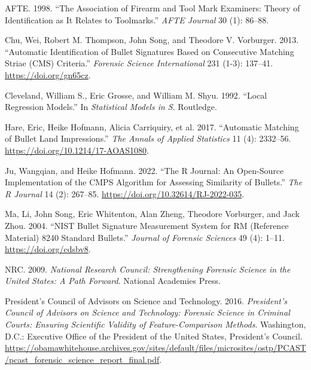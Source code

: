 \documentclass[fleqn,10pt]{wlscirep}
\newlength{\cslhangindent}
\newenvironment{CSLReferences}[2] %
{\begin{list}{}{%
	\setlength{\itemindent}{0pt}
	\setlength{\leftmargin}{0pt}
	\setlength{\parsep}{0pt}
	\ifodd #1
	\setlength{\leftmargin}{\cslhangindent}
	\setlength{\itemindent}{-1\cslhangindent}
	\fi
	\setlength{\itemsep}{#2\baselineskip}}}
{\end{list}}
\begin{document}
\label{refs}
\begin{CSLReferences}{1}{0}
AFTE. 1998. {``The Association of Firearm and Tool Mark Examiners:
{Theory} of Identification as It Relates to Toolmarks.''} \emph{AFTE
Journal} 30 (1): 86--88.

Chu, Wei, Robert M. Thompson, John Song, and Theodore V. Vorburger.
2013. {``Automatic Identification of Bullet Signatures Based on
Consecutive Matching Striae ({CMS}) Criteria.''} \emph{Forensic Science
International} 231 (1-3): 137--41. \url{https://doi.org/gn65cz}.

Cleveland, William S., Eric Grosse, and William M. Shyu. 1992. {``Local
{Regression Models}.''} In \emph{Statistical {Models} in {S}}.
Routledge.

Hare, Eric, Heike Hofmann, Alicia Carriquiry, et al. 2017. {``Automatic
Matching of Bullet Land Impressions.''} \emph{The Annals of Applied
Statistics} 11 (4): 2332--56. \url{https://doi.org/10.1214/17-AOAS1080}.

Ju, Wangqian, and Heike Hofmann. 2022. {``The {R Journal}: {An
Open-Source Implementation} of the {CMPS Algorithm} for {Assessing
Similarity} of {Bullets}.''} \emph{The R Journal} 14 (2): 267--85.
\url{https://doi.org/10.32614/RJ-2022-035}.

Ma, Li, John Song, Eric Whitenton, Alan Zheng, Theodore Vorburger, and
Jack Zhou. 2004. {``{NIST Bullet Signature Measurement System} for {RM}
({Reference Material}) 8240 {Standard Bullets}.''} \emph{Journal of
Forensic Sciences} 49 (4): 1--11. \url{https://doi.org/cdsbv8}.

NRC. 2009. \emph{National Research Council: {Strengthening} Forensic
Science in the United States: {A} Path Forward}. National Academies
Press.

President's Council of Advisors on Science and Technology. 2016.
\emph{President's Council of Advisors on Science and Technology:
{Forensic} Science in Criminal Courts: {Ensuring} Scientific Validity of
Feature-Comparison Methods}. Washington, D.C.: Executive Office of the
President of the United States, President's Council.
\url{https://obamawhitehouse.archives.gov/sites/default/files/microsites/ostp/PCAST/pcast_forensic_science_report_final.pdf}.


\end{CSLReferences}
\end{document}
